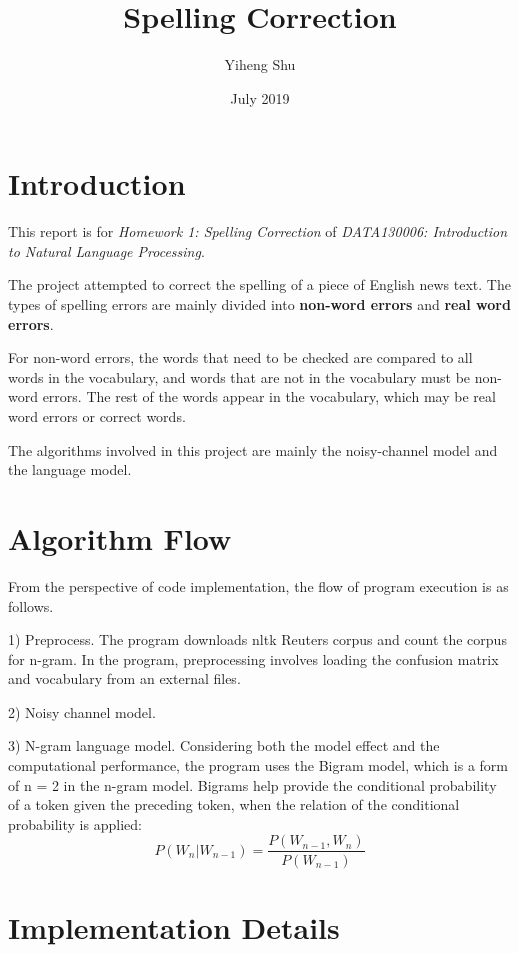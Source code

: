 \documentclass{article}
\title{Spelling Correction}
\author[*]{Yiheng Shu}
\affil[*]{Software College, Northeastern University, China}
\date{July 2019}
\begin{document}
    \maketitle

    \section{Introduction}\label{sec:introduction}
    This report is for \textit{Homework 1: Spelling Correction} of \textit{DATA130006: Introduction to Natural Language Processing}.

    The project attempted to correct the spelling of a piece of English news text.
    The types of spelling errors are mainly divided into \textbf{non-word errors} and \textbf{real word errors}.

    For non-word errors, the words that need to be checked are compared to all words in the vocabulary, and words that are not in the vocabulary must be non-word errors.
    The rest of the words appear in the vocabulary, which may be real word errors or correct words.

    The algorithms involved in this project are mainly the noisy-channel model and the language model.

    \section{Algorithm Flow}
    \label{sec:algorithm-flow}

    From the perspective of code implementation, the flow of program execution is as follows.

    1) Preprocess.
    The program downloads nltk Reuters corpus and count the corpus for n-gram.
    In the program, preprocessing involves loading the confusion matrix and vocabulary from an external files.

    2) Noisy channel model.

    3) N-gram language model. Considering both the model effect and the computational performance, the program uses the Bigram model, which is a form of n = 2 in the n-gram model. Bigrams help provide the conditional probability of a token given the preceding token, when the relation of the conditional probability is applied:
    $$
    P(W_n | W_{n-1}) = \frac{P(W_{n-1}, W_n)}{P(W_{n-1})}
    $$

    \section{Implementation Details}
    \label{sec:implementation-details}
\end{document}

